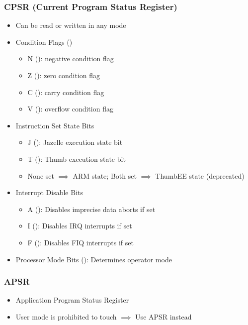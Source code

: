 \subsubsection*{CPSR (Current Program Status Register)}
\begin{figures}
\end{figures}
\begin{itemize}
    \item Can be read or written in any mode
    \item Condition Flags ()
    \begin{itemize}
        \item N (): negative condition flag
        \item Z (): zero condition flag
        \item C (): carry condition flag
        \item V (): overflow condition flag
    \end{itemize}
    \item Instruction Set State Bits
    \begin{itemize}
        \item J (): Jazelle execution state bit
        \item T (): Thumb execution state bit
        \item None set $\implies$ ARM state; Both set $\implies$ ThumbEE state (deprecated) 
    \end{itemize}
    \item Interrupt Disable Bits
    \begin{itemize}
        \item A (): Disables imprecise data aborts if set
        \item I (): Disables IRQ interrupts if set
        \item F (): Disables FIQ interrupts if set
    \end{itemize}
    \item Processor Mode Bits (): Determines operator mode
\end{itemize}

\subsubsection*{APSR}
\begin{itemize}
    \item Application Program Status Register
    \item User mode is prohibited to touch  $\implies$ Use APSR instead
\end{itemize}

